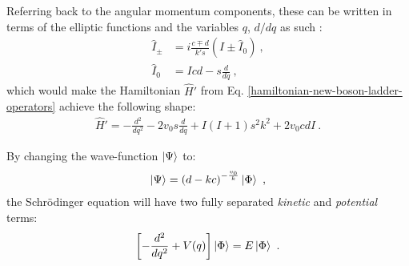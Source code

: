 Referring back to the angular momentum components, these can be written in terms of the elliptic functions and the variables $q$, $d/dq$ as such \cite{raduta2020new}:
\begin{align}
    \hat{I}_\pm&=i\frac{c\mp d}{k's}\left(I\pm\hat{I}_0\right)\ ,\nonumber\\
    \hat{I}_0&=Icd-s\frac{d}{dq}\ ,
    \label{angular-momentum-elliptic-representation}
\end{align}
which would make the Hamiltonian $\hat{H}'$ from Eq. \ref{hamiltonian-new-boson-ladder-operators} achieve the following shape:
\begin{align}
    \hat{H}'=-\frac{d^2}{dq^2}-2v_0s\frac{d}{dq}+I(I+1)s^2k^2+2v_0cdI\ .
\end{align}

By changing the wave-function $\ket{\Psi}$ to:
\begin{align}
    \ket{\Psi}=\left(d-kc\right)^{-\frac{v_0}{k}}\ket{\Phi}\ ,
\end{align}
the Schrödinger equation will have two fully separated \emph{kinetic} and \emph{potential} terms:
\begin{align}
    \left[-\frac{d^2}{dq^2}+V(q)\right]\ket{\Phi}=E\ket{\Phi}\ .
    \label{schrodinger-equation-elliptic}
\end{align}

